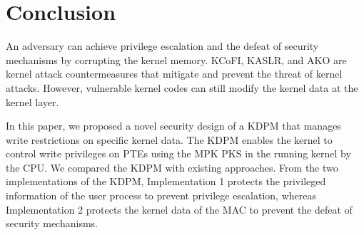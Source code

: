 \section{Conclusion}  \label{section:conclustion}
%

An adversary can achieve privilege escalation and the defeat of security
mechanisms by corrupting the kernel memory.
%
KCoFI, KASLR, and AKO are kernel attack countermeasures that mitigate and
prevent the threat of kernel attacks.
%
However, vulnerable kernel codes can still modify the kernel data at the kernel layer.

%
In this paper, we proposed a novel security design of a KDPM that manages write
restrictions on specific kernel data.
The KDPM enables the kernel to control write privileges on PTEs using the MPK PKS
in the running kernel by the CPU.
%
We compared the KDPM with existing approaches.
%
%
From the two implementations of the KDPM, Implementation 1 protects the
privileged information of the user process to prevent privilege escalation,
whereas Implementation 2 protects the kernel data of the MAC to prevent the
defeat of security mechanisms.

